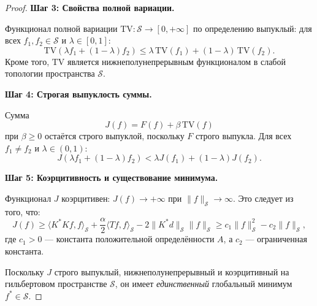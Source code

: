 \documentclass[a4paper,14pt,oneside,openany]{extarticle}
\begin{document}
\begin{proof}
\textbf{Шаг 3: Свойства полной вариации.}

Функционал полной вариации $\mathrm{TV}:\mathcal{S}\to[0,+\infty]$ по определению выпуклый: для всех $f_1, f_2 \in \mathcal{S}$ и $\lambda \in [0,1]$:
\begin{equation}
    \mathrm{TV}(\lambda f_1 + (1-\lambda)f_2) \leq \lambda \,\mathrm{TV}(f_1) + (1-\lambda)\,\mathrm{TV}(f_2).
\end{equation}
Кроме того, $\mathrm{TV}$ является нижнеполунепрерывным функционалом в слабой топологии пространства $\mathcal{S}$.

\textbf{Шаг 4: Строгая выпуклость суммы.}

Сумма 
\begin{equation}
    J(f) = F(f) + \beta \,\mathrm{TV}(f)
\end{equation}
при $\beta \geq 0$ остаётся строго выпуклой, поскольку $F$ строго выпукла. Для всех $f_1 \neq f_2$ и $\lambda \in (0,1)$:
\begin{equation}
    J(\lambda f_1 + (1-\lambda)f_2) < \lambda J(f_1) + (1-\lambda)J(f_2).
\end{equation}


\textbf{Шаг 5: Коэрцитивность и существование минимума.}

Функционал $J$ коэрцитивен: $J(f) \to +\infty$ при $\|f\|_{\mathcal{S}} \to \infty$. Это следует из того, что:
\begin{equation}
    J(f) \geq \langle K^*K f, f\rangle_{\mathcal{S}} + \frac{\alpha}{2}\langle T f, f\rangle_{\mathcal{S}} - 
    2\|K^*d\|_{\mathcal{S}} \|f\|_{\mathcal{S}} \geq c_1 \|f\|_{\mathcal{S}}^2 - c_2 \|f\|_{\mathcal{S}},
\end{equation}
где $c_1 > 0$ — константа положительной определённости $A$, а $c_2$ — ограниченная константа.

Поскольку $J$ строго выпуклый, нижнеполунепрерывный и коэрцитивный на гильбертовом пространстве $\mathcal{S}$, 
он имеет \textit{единственный} глобальный минимум $f^* \in \mathcal{S}$.
\end{proof}
\end{document}
